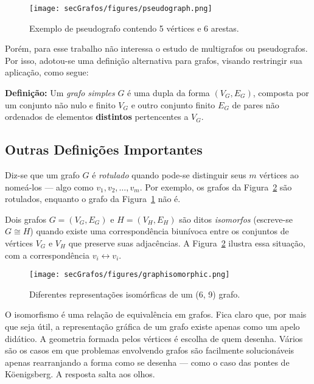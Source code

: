 \begin{figure}[H]
	\begin{center}
		\texttt{[image: secGrafos/figures/pseudograph.png]}
	\end{center}
	\caption{Exemplo de pseudografo contendo 5 vértices e 6 arestas.}
	\label{fig:pseudograph}
\end{figure}

Porém, para esse trabalho não interessa o estudo de multigrafos ou pseudografos. Por isso, adotou-se uma definição alternativa para grafos, visando restringir sua aplicação, como segue:

\begin{center}
	\begin{minipage}{0.9 \linewidth}
		\textbf{Definição:} Um \textit{grafo simples} $G$ é uma dupla da forma $(V_G,E_G)$, composta por um conjunto não nulo e finito $V_G$ e outro conjunto finito $E_G$ de pares não ordenados de elementos \textbf{distintos} pertencentes a $V_G$.
	\end{minipage}
\end{center} 

\subsection{Outras Definições Importantes}

Diz-se que um grafo $G$ é \textit{rotulado} quando pode-se distinguir seus $m$ vértices ao nomeá-los --- algo como $v_1, v_2, \dots, v_m$. Por exemplo, os grafos da Figura~\ref{fig:graphisomorphic} são rotulados, enquanto o grafo da Figura~\ref{fig:pseudograph} não é. 

Dois grafos $G = (V_G, E_G)$ e $H = (V_H, E_H)$ são ditos \textit{isomorfos} (escreve-se $G \cong H$) quando existe uma correspondência biunívoca entre os conjuntos de vértices $V_G$ e $V_H$ que preserve suas adjacências. A Figura~\ref{fig:graphisomorphic} ilustra essa situação, com a correspondência $v_i \longleftrightarrow v_i$.

\begin{figure}[H]
	\begin{center}
		\texttt{[image: secGrafos/figures/graphisomorphic.png]}
	\end{center}
	\caption{Diferentes representações isomórficas de um (6, 9) grafo.}
	\label{fig:graphisomorphic}
\end{figure}

O isomorfismo é uma relação de equivalência em grafos. Fica claro que, por mais que seja útil, a representação gráfica de um grafo existe apenas como um apelo didático. A geometria formada pelos vértices é escolha de quem desenha. Vários são os casos em que problemas envolvendo grafos são facilmente solucionáveis apenas rearranjando a forma como se desenha --- como o caso das pontes de Köenigsberg. A resposta salta aos olhos.

